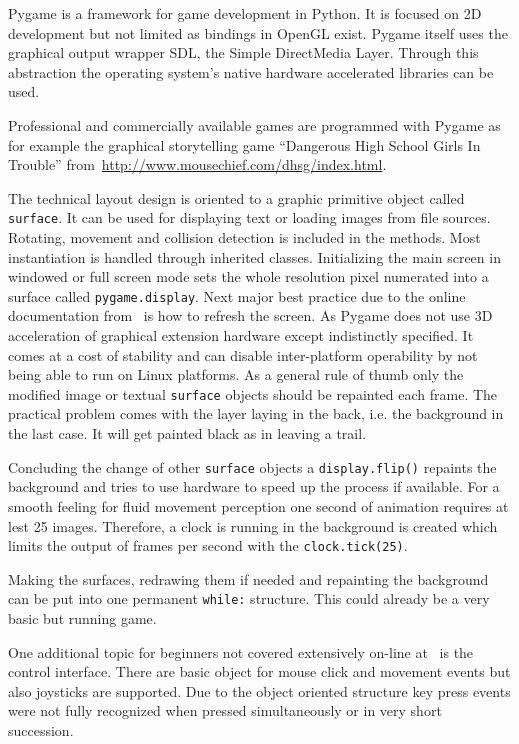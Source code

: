 \documentclass[bibtotocnumbered, headsepline,normalheadings,12pt]{report}
\begin{document}
Pygame is a framework for game development in Python. It is focused on 2D development but not limited as bindings in OpenGL
exist. Pygame itself uses the graphical output wrapper SDL, the Simple DirectMedia Layer. Through this abstraction the 
operating system's native hardware accelerated libraries can be used.

Professional and commercially available games are programmed with Pygame as for example the graphical storytelling game
``Dangerous High School Girls In Trouble'' from~\url{http://www.mousechief.com/dhsg/index.html}.

The technical layout design is oriented to a graphic primitive object called \texttt{surface}. It can be used for displaying text
or loading images from file sources. Rotating, movement and collision detection is included in the methods. Most instantiation 
is handled through inherited classes. Initializing the main screen in windowed or full screen mode sets the whole resolution pixel 
numerated into a surface called \texttt{pygame.display}.
Next major best practice due to the online documentation from~\cite{pynew} is how to refresh the screen. As Pygame does 
not use 3D acceleration of graphical extension hardware except indistinctly specified. It comes at a cost of stability and
can disable inter-platform operability by not being able to run on Linux platforms.
As a general rule of thumb only the modified image or textual \texttt{surface} objects should be repainted each frame. The
practical problem comes with the layer laying in the back, i.e. the background in the last case. It will get painted black
as in leaving a trail.

Concluding the change of other \texttt{surface} objects a \texttt{display.flip()} repaints the background and tries to use
hardware to speed up the process if available. For a smooth feeling for fluid movement perception one second of animation
requires at lest 25 images. Therefore, a clock is running in the background is created which limits the output of frames 
per second with the \texttt{clock.tick(25)}.

Making the surfaces, redrawing them if needed and repainting the background can be put into one permanent \texttt{while:} structure.
This could already be a very basic but running game.

One additional topic for beginners not covered extensively on-line at~\cite{pynew} is the control interface. There are 
basic object for mouse click and movement events but also joysticks are supported. Due to the object oriented structure
key press events were not fully recognized when pressed simultaneously or in very short succession.
\end{document}
